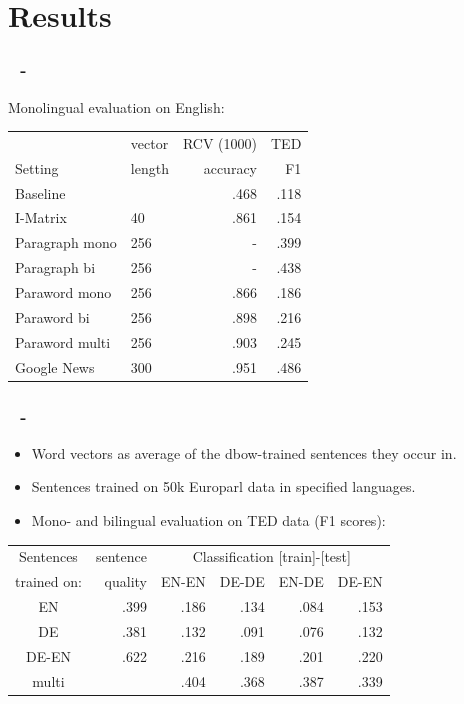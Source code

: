 \documentclass{beamer}
\newenvironment{dia}
{
\begin{frame}[fragile, environment=dia]
\frametitle{\insertsection
\ifx\insertsubsection\empty\else
      \,~-~\insertsubsection             %
   \fi}
}
{
\end{frame}
}
\begin{document}
\section{Results}
\begin{dia}
Monolingual evaluation on English:
\begin{table}
\begin{tabular}{l l r r}
 			&vector	&RCV (1000)		&TED		\\
Setting		&length	&accuracy		&F1		\\\hline
Baseline		&		&.468			&.118	 	\\
I-Matrix		&40		&.861			&.154		\\
Paragraph mono	&256		&-			&.399		\\
Paragraph bi 	&256		&-			&.438		\\
Paraword mono	&256		&.866			&.186		\\
Paraword bi 		&256		&.898			&.216		\\
Paraword multi 	&256		&.903			&.245		\\	
Google News		&300		&.951			&.486		\\
\end{tabular}
\end{table}
\end{dia}


\begin{dia}
\begin{itemize}
\item Word vectors as average of the dbow-trained sentences they occur in.
\item Sentences trained on 50k Europarl data in specified languages.
\item Mono- and bilingual evaluation on TED data (F1 scores):
\end{itemize}
\begin{table}
\begin{tabular}{c | r|r r r r }
Sentences 		&sentence	&	\multicolumn{4}{c}{Classification [train]-[test]}	\\
trained on: 		&quality	&EN-EN	&DE-DE	&EN-DE	&DE-EN	\\\hline
EN			&.399		&.186		&.134		&.084		&.153		\\
DE			&.381		&.132		&.091		&.076		&.132	\\
DE-EN			&.622		&.216		&.189		&.201		&.220		\\
multi 			&		&.404		&.368		&.387		&.339		\\
\end{tabular}
\end{table}
\end{dia}
\end{document}
